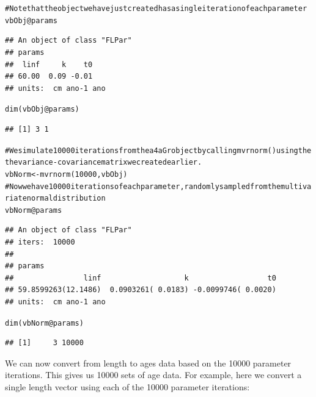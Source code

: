 \documentclass[a4paper,english,10pt]{article}\usepackage[]{graphicx}\usepackage[]{color}
\makeatletter
\newcommand{\hlnum}[1]{\textcolor[rgb]{0.2,0.2,0.2}{#1}}%
\newcommand{\hlcom}[1]{\textcolor[rgb]{0.2,0.267,0.4}{#1}}%
\newcommand{\hlopt}[1]{\textcolor[rgb]{0.2,0.2,0.2}{#1}}%
\newcommand{\hlstd}[1]{\textcolor[rgb]{0,0,0}{#1}}%
\newcommand{\hlkwb}[1]{\textcolor[rgb]{0.361,0.506,0.596}{#1}}%
\newcommand{\hlkwc}[1]{\textcolor[rgb]{0.361,0.506,0.596}{#1}}%
\newcommand{\hlkwd}[1]{\textcolor[rgb]{0.361,0.506,0.596}{#1}}%
\newenvironment{kframe}{%
 \def\at@end@of@kframe{}%
 \ifinner\ifhmode%
  \def\at@end@of@kframe{\end{minipage}}%
  \begin{minipage}{\columnwidth}%
 \fi\fi%
 \def\FrameCommand##1{\hskip\@totalleftmargin \hskip-\fboxsep
 \colorbox{shadecolor}{##1}\hskip-\fboxsep
     \hskip-\linewidth \hskip-\@totalleftmargin \hskip\columnwidth}%
 \MakeFramed {\advance\hsize-\width
   \@totalleftmargin\z@ \linewidth\hsize
   \@setminipage}}%
 {\par\unskip\endMakeFramed%
 \at@end@of@kframe}
\newenvironment{knitrout}{}{} %
\makeatother
\begin{document}
\begin{knitrout}
\color{fgcolor}\begin{kframe}
\begin{alltt}
\hlcom{# Note that the object we have just created has a single iteration of each parameter}
\hlstd{vbObj}\hlopt{@}\hlkwc{params}
\end{alltt}
\begin{verbatim}
## An object of class "FLPar"
## params
##  linf     k    t0 
## 60.00  0.09 -0.01 
## units:  cm ano-1 ano
\end{verbatim}
\begin{alltt}
\hlkwd{dim}\hlstd{(vbObj}\hlopt{@}\hlkwc{params}\hlstd{)}
\end{alltt}
\begin{verbatim}
## [1] 3 1
\end{verbatim}
\begin{alltt}
\hlcom{# We simulate 10000 iterations from the a4aGr object by calling mvrnorm() using the the variance-covariance matrix we created earlier.}
\hlstd{vbNorm} \hlkwb{<-} \hlkwd{mvrnorm}\hlstd{(}\hlnum{10000}\hlstd{,vbObj)}
\hlcom{# Now we have 10000 iterations of each parameter, randomly sampled from the multivariate normal distribution}
\hlstd{vbNorm}\hlopt{@}\hlkwc{params}
\end{alltt}
\begin{verbatim}
## An object of class "FLPar"
## iters:  10000 
## 
## params
##                linf                   k                  t0 
## 59.8599263(12.1486)  0.0903261( 0.0183) -0.0099746( 0.0020) 
## units:  cm ano-1 ano
\end{verbatim}
\begin{alltt}
\hlkwd{dim}\hlstd{(vbNorm}\hlopt{@}\hlkwc{params}\hlstd{)}
\end{alltt}
\begin{verbatim}
## [1]     3 10000
\end{verbatim}
\end{kframe}
\end{knitrout}

We can now convert from length to ages data based on the 10000 parameter iterations. This gives us 10000 sets of age data. For example, here we convert a single length vector using each of the 10000 parameter iterations: 
\end{document}
